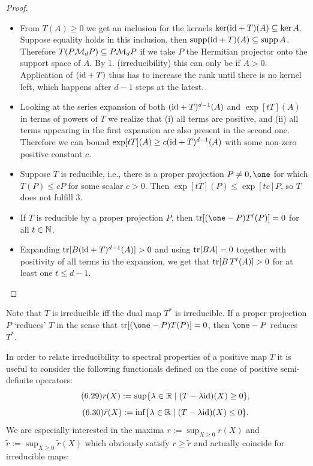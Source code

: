 \documentclass[11pt,a4paper]{article}
\theoremstyle{plain}
\theoremstyle{definition}
\theoremstyle{remark}
\begin{document}
\begin{proof}
    \begin{itemize}
        \item[1.\ $\Rightarrow$ 2.]
              From $T(A)\ge 0$ we get an inclusion for the kernels
              $\ker(\mathrm{id}+T)(A)\subseteq \ker A$. Suppose equality holds in this inclusion, then
              $\operatorname{supp}(\mathrm{id}+T)(A)\subseteq \operatorname{supp} A$. Therefore $T(P\mathcal{M}_dP)\subseteq P\mathcal{M}_dP$ if
              we take $P$ the Hermitian projector onto the support space of $A$. By 1.
              (irreducibility) this can only be if $A>0$. Application of $(\mathrm{id}+T)$ thus has to
              increase the rank until there is no kernel left, which happens after $d-1$ steps
              at the latest.

        \item[2.\ $\Rightarrow$ 3.]
              Looking at the series expansion of both $(\mathrm{id}+T)^{d-1}(A)$ and $\exp[tT](A)$ in
              terms of powers of $T$ we realize that (i) all terms are positive, and (ii) all
              terms appearing in the first expansion are also present in the second one.
              Therefore we can bound $\exp[tT](A)\ge c(\mathrm{id}+T)^{d-1}(A)$ with some non-zero
              positive constant $c$.

        \item[3.\ $\Rightarrow$ 1.]
              Suppose $T$ is reducible, i.e., there is a proper projection $P\neq 0,\one$ for
              which $T(P)\le cP$ for some scalar $c>0$. Then $\exp[tT](P)\le \exp[tc]P$, so $T$
              does not fulfill 3.

        \item[4.\ $\Rightarrow$ 1.]
              If $T$ is reducible by a proper projection $P$, then $\tr[(\one-P)T^t(P)]=0$ for
              all $t\in\mathbb{N}$.

        \item[2.\ $\Rightarrow$ 4.]
              Expanding $\operatorname{tr}[B(\mathrm{id}+T)^{d-1}(A)]>0$ and using $\operatorname{tr}[BA]=0$ together with positivity
              of all terms in the expansion, we get that $\operatorname{tr}[B\,T^t(A)]>0$ for at least one
              $t\le d-1$.
    \end{itemize}
\end{proof}

Note that $T$ is irreducible iff the dual map $T^*$ is irreducible. If a proper
projection $P$ `reduces' $T$ in the sense that $\tr[(\one-P)T(P)]=0$, then $\one-P$
reduces $T^*$.

In order to relate irreducibility to spectral properties of a positive map $T$ it
is useful to consider the following functionals defined on the cone of positive
semi-definite operators:
\begin{equation}\tag{6.29}\label{eq:6.29}
    r(X) := \sup\{\lambda\in\mathbb{R} \mid (T-\lambda\mathrm{id})(X)\ge 0\},
\end{equation}
\begin{equation}\tag{6.30}\label{eq:6.30}
    \tilde r(X) := \inf\{\lambda\in\mathbb{R} \mid (T-\lambda\mathrm{id})(X)\le 0\}.
\end{equation}
We are especially interested in the maxima
$r := \sup_{X\ge 0} r(X)$ and $\tilde r := \sup_{X\ge 0}\tilde r(X)$ which
obviously satisfy $r\ge \tilde r$ and actually coincide for irreducible maps:
\end{document}
